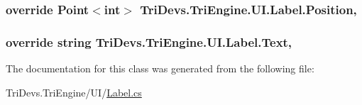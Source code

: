 \hypertarget{class_tri_devs_1_1_tri_engine_1_1_u_i_1_1_label_af28958c2a190e348f03ee82431f072a3}{
\subsubsection[{Position}]{\setlength{\rightskip}{0pt plus 5cm}override Point$<$int$>$ Tri\-Devs.\-Tri\-Engine.\-U\-I.\-Label.\-Position\hspace{0.3cm}{\ttfamily [get]}, {\ttfamily [set]}}}\label{class_tri_devs_1_1_tri_engine_1_1_u_i_1_1_label_af28958c2a190e348f03ee82431f072a3}
\hypertarget{class_tri_devs_1_1_tri_engine_1_1_u_i_1_1_label_a3688a2efb2860794c6c29360f49cb4f1}{
\subsubsection[{Text}]{\setlength{\rightskip}{0pt plus 5cm}override string Tri\-Devs.\-Tri\-Engine.\-U\-I.\-Label.\-Text\hspace{0.3cm}{\ttfamily [get]}, {\ttfamily [set]}}}\label{class_tri_devs_1_1_tri_engine_1_1_u_i_1_1_label_a3688a2efb2860794c6c29360f49cb4f1}


The documentation for this class was generated from the following file\-:\begin{DoxyCompactItemize}
\item 
Tri\-Devs.\-Tri\-Engine/\-U\-I/\hyperlink{_label_8cs}{Label.\-cs}\end{DoxyCompactItemize}
